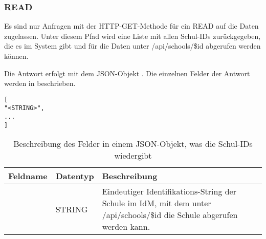\subsubsection{READ}
\label{sec:rest:api:school:read}
Es sind nur Anfragen mit der HTTP-GET-Methode für ein READ auf die Daten zugelassen.
Unter diesem Pfad wird eine Liste mit allen Schul-IDs zurückgegeben, die es im System gibt und für die Daten unter /api/schools/\$id abgerufen werden können.

Die Antwort erfolgt mit dem JSON-Objekt . 
Die einzelnen Felder der Antwort werden in  beschrieben.

\begin{lstlisting}[caption={JSON-Antwort für einen GET-Aufruf des Pfads /api/schools},label={lst:code:rest:api:school:read:ret},frame=tlrb]
[
"<STRING>",
...
]
\end{lstlisting}

\begin{longtable}{|p{}|p{}|p{}|}
		\caption{Beschreibung des Felder in einem JSON-Objekt, was die Schul-IDs wiedergibt}
\endfoot
		\caption{Beschreibung des Felder in einem JSON-Objekt, was die Schul-IDs wiedergibt}
		\label{tab:rest:api:school:read:ret}
\endlastfoot 
\hline
			\textbf{Feldname} & \textbf{Datentyp} & \textbf{Beschreibung} \\ \hline
\endhead
 & STRING & Eindeutiger Identifikations-String der Schule im IdM, mit dem unter /api/schools/\$id die Schule abgerufen werden kann.\\ \hline
\end{longtable}
